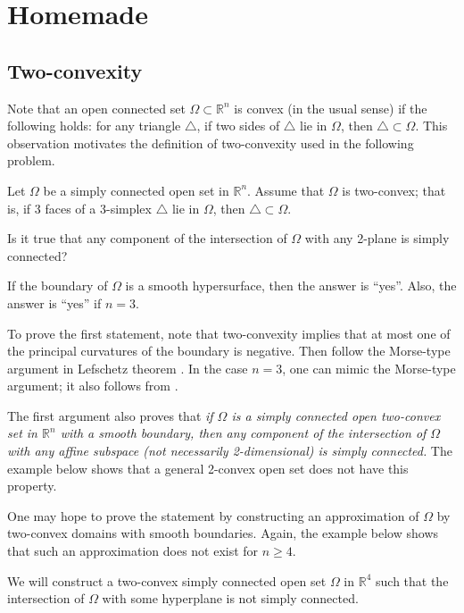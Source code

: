 
\section*{Homemade}

\subsection{Two-convexity}
\label{Two-convexity}

Note that an open connected set $\Omega\subset\mathbb R^n$ is convex (in the usual sense) if the following holds:
for any triangle $\triangle$, if two sides of $\triangle$ lie in $\Omega$, then $\triangle\subset\Omega$.
This observation motivates the definition of two-convexity used in the following problem.

\begin{pr}
Let $\Omega$ be a simply connected open set in $\mathbb R^n$.
Assume that $\Omega$ is two-convex;
that is, if 3 faces of a 3-simplex $\triangle$ lie in $\Omega$, then $\triangle\subset\Omega$.

Is it true that any component of the intersection of $\Omega$ with any 2-plane is simply connected?
\end{pr}

If the boundary of $\Omega$ is a smooth hypersurface, then the answer is ``yes''.
Also, the answer is ``yes'' if $n=3$.

To prove the first statement, note that two-convexity implies that
at most one of the principal curvatures of the boundary is negative.
Then follow the Morse-type argument in Lefschetz theorem \cite[see Section~$\tfrac12$ in][]{gromov-SGMC}.
In the case $n=3$, one can mimic the Morse-type argument;
it also follows from \cite[7.17 in][]{AKP-invitation-2}.

The first argument also proves that \textit{if $\Omega$ is a simply connected open two-convex set in $\mathbb R^n$ with a smooth boundary, then any component of the intersection of $\Omega$ with any affine subspace (not necessarily 2-dimensional) is simply connected.}
The example below shows that a general 2-convex open set does not have this property.

One may hope to prove the statement by constructing an approximation of $\Omega$ by two-convex domains with smooth boundaries.
Again, the example below shows that such an approximation does not exist for $n\ge 4$.

We will construct a two-convex simply connected open set $\Omega$ in $\mathbb R^4$ such that the intersection of $\Omega$ with some hyperplane is not simply connected.

